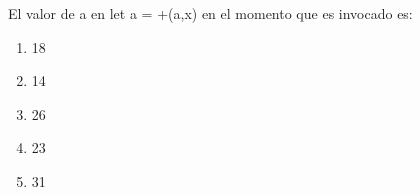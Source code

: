 {
El valor de a en let a = +(a,x) en el momento que es invocado es:
\begin{enumerate}
	\item 18
	\item 14
	\item 26
	\item 23 %
	\item 31
\end{enumerate}
}
